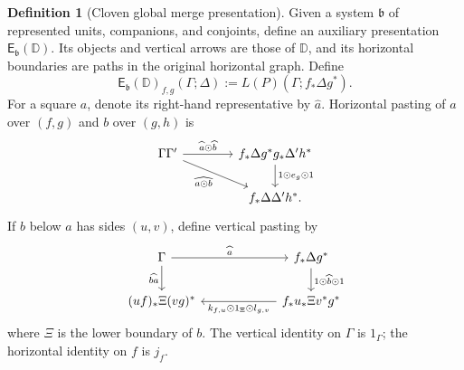 \documentclass[11pt,reqno]{amsart}
\theoremstyle{plain}
\theoremstyle{definition}
\newtheorem{definition}[theorem]{Definition}
\theoremstyle{remark}
\numberwithin{equation}{section}
\newcommand{\D}{\mathbb D}
\newcommand{\E}{\mathsf E}
\newcommand{\wh}{\mathbin{\odot}}
\begin{document}
\begin{definition}[Cloven global merge presentation]\label{def:global}
Given a system $\mathfrak b$ of represented units, companions, and
conjoints, define an auxiliary presentation $\E_{\mathfrak b}(\D)$.
Its objects and vertical arrows are those of $\D$, and its horizontal
boundaries are paths in the original horizontal graph. Define
\begin{equation}\label{eq:globalcells}
 \E_{\mathfrak b}(\D)_{f,g}(\Gamma;\Delta)
 :=L(P)(\Gamma;f_*\Delta g^*).
\end{equation}
For a square $a$, denote its right-hand representative by $\widehat a$.
Horizontal pasting of $a$ over $(f,g)$ and $b$ over $(g,h)$ is
\begin{equation}\label{eq:hcomp}
\begin{tikzcd}[column sep=4em]
\Gamma\Gamma' \arrow[r,"\widehat a\wh\widehat b"]
  \arrow[dr,"\widehat{a\wh b}"'] &
f_*\Delta g^*g_*\Delta'h^*
  \arrow[d,"1\wh e_g\wh1"]\\
& f_*\Delta\Delta'h^*.
\end{tikzcd}
\end{equation}
If $b$ below $a$ has sides $(u,v)$, define vertical pasting by
\begin{equation}\label{eq:vcomp}
\begin{tikzcd}[column sep=6em]
\Gamma \arrow[r,"\widehat a"] \arrow[d,"\widehat{ba}"'] &
f_*\Delta g^* \arrow[d,"1\wh\widehat b\wh1"]\\
(uf)_*\Xi(vg)^* & f_*u_*\Xi v^*g^*
\arrow[l,"k_{f,u}\wh1_\Xi\wh l_{g,v}"]
\end{tikzcd}
\end{equation}
where $\Xi$ is the lower boundary of $b$.
The vertical identity on $\Gamma$ is $1_\Gamma$; the horizontal identity
on $f$ is $j_f$.
\end{definition}
\end{document}
